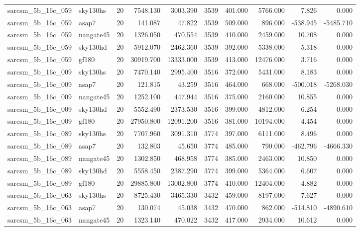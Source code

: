 \documentclass{article}
\begin{document}
\begin{longtable}{llrrrrrrrr}
sarcsm\_5b\_16c\_059 & sky130hs & 20 & 7548.130 & 3003.390 & 3539 & 401.000 & 5766.000 & 7.826 & 0.000 \\
sarcsm\_5b\_16c\_059 & asap7 & 20 & 141.087 & 47.822 & 3539 & 509.000 & 896.000 & -538.945 & -5485.710 \\
sarcsm\_5b\_16c\_059 & nangate45 & 20 & 1326.050 & 470.554 & 3539 & 410.000 & 2459.000 & 10.708 & 0.000 \\
sarcsm\_5b\_16c\_059 & sky130hd & 20 & 5912.070 & 2462.360 & 3539 & 392.000 & 5338.000 & 5.318 & 0.000 \\
sarcsm\_5b\_16c\_059 & gf180 & 20 & 30919.700 & 13333.000 & 3539 & 413.000 & 12476.000 & 3.716 & 0.000 \\
sarcsm\_5b\_16c\_009 & sky130hs & 20 & 7470.140 & 2995.400 & 3516 & 372.000 & 5431.000 & 8.183 & 0.000 \\
sarcsm\_5b\_16c\_009 & asap7 & 20 & 121.815 & 43.259 & 3516 & 464.000 & 668.000 & -500.018 & -5268.030 \\
sarcsm\_5b\_16c\_009 & nangate45 & 20 & 1252.100 & 447.944 & 3516 & 375.000 & 2160.000 & 10.855 & 0.000 \\
sarcsm\_5b\_16c\_009 & sky130hd & 20 & 5552.490 & 2373.530 & 3516 & 399.000 & 4812.000 & 6.254 & 0.000 \\
sarcsm\_5b\_16c\_009 & gf180 & 20 & 27950.800 & 12091.200 & 3516 & 381.000 & 10194.000 & 4.454 & 0.000 \\
sarcsm\_5b\_16c\_089 & sky130hs & 20 & 7707.960 & 3091.310 & 3774 & 397.000 & 6111.000 & 8.496 & 0.000 \\
sarcsm\_5b\_16c\_089 & asap7 & 20 & 132.803 & 45.650 & 3774 & 485.000 & 790.000 & -462.796 & -4666.330 \\
sarcsm\_5b\_16c\_089 & nangate45 & 20 & 1302.850 & 468.958 & 3774 & 385.000 & 2463.000 & 10.850 & 0.000 \\
sarcsm\_5b\_16c\_089 & sky130hd & 20 & 5558.450 & 2387.290 & 3774 & 399.000 & 5364.000 & 6.607 & 0.000 \\
sarcsm\_5b\_16c\_089 & gf180 & 20 & 29885.800 & 13002.800 & 3774 & 410.000 & 12404.000 & 4.882 & 0.000 \\
sarcsm\_5b\_16c\_063 & sky130hs & 20 & 8725.430 & 3465.330 & 3432 & 459.000 & 8197.000 & 7.627 & 0.000 \\
sarcsm\_5b\_16c\_063 & asap7 & 20 & 130.074 & 45.038 & 3432 & 470.000 & 862.000 & -514.810 & -4890.610 \\
sarcsm\_5b\_16c\_063 & nangate45 & 20 & 1323.140 & 470.022 & 3432 & 417.000 & 2934.000 & 10.612 & 0.000 \\

\end{longtable}
\end{document}
